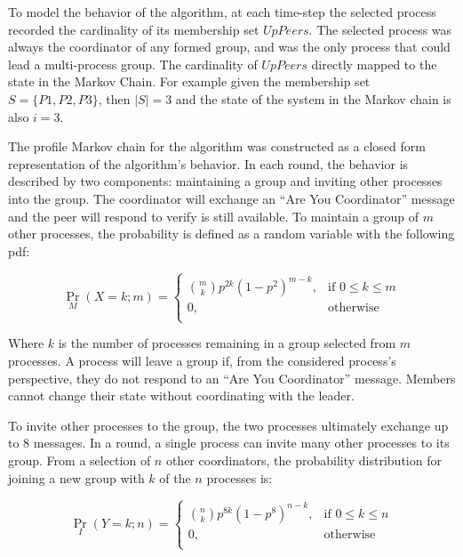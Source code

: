 To model the behavior of the algorithm, at each time-step the selected process recorded the cardinality of its membership set $UpPeers$.
The selected process was always the coordinator of any formed group, and was the only process that could lead a multi-process group.
The cardinality of $UpPeers$ directly mapped to the state in the Markov Chain.
For example given the membership set $S=\{P1,P2,P3\}$, then $\left | S \right |=3$ and the state of the system in the Markov chain is also $i=3$.

The profile Markov chain for the algorithm was constructed as a closed form representation of the algorithm's behavior.
In each round, the behavior is described by two components: maintaining a group and inviting other processes into the group.
The coordinator will exchange an ``Are You Coordinator'' message and the peer will respond to verify is still available.
To maintain a group of $m$ other processes, the probability is defined as a random variable with the following \ac{pdf}:

\begin{equation}
 \Pr_{M}(X=k; m) =
   \begin{cases}
    \binom{m}{k} p^{2k}(1-p^2)^{m-k}, & \text{if } 0 \leq k \leq m \\
    0,                                & \text{otherwise} \\
  \end{cases}
\end{equation}

Where $k$ is the number of processes remaining in a group selected from $m$ processes.
A process will leave a group if, from the considered process's perspective, they do not respond to an ``Are You Coordinator'' message.
Members cannot change their state without coordinating with the leader.

To invite other processes to the group, the two processes ultimately exchange up to 8 messages.
In a round, a single process can invite many other processes to its group.
From a selection of $n$ other coordinators, the probability distribution for joining a new group with $k$ of the $n$ processes is:

\begin{equation}
    \Pr_{I}(Y=k; n) =
    \begin{cases}
        \binom{n}{k} p^{8k}(1-p^8)^{n-k}, & \text{if } 0 \leq k \leq n \\
        0,                                & \text{otherwise} \\
    \end{cases}
\end{equation}

